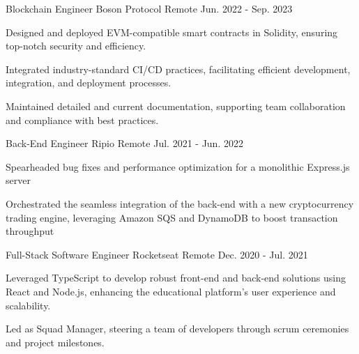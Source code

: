 

\begin{cventries}

  \cventry
    {Blockchain Engineer} %
    {Boson Protocol} %
    {Remote} %
    {Jun. 2022 - Sep. 2023} %
    {
      \begin{cvitems} %
        \item {Designed and deployed EVM-compatible smart contracts in Solidity, ensuring top-notch security and efficiency.}
        \item {Integrated industry-standard CI/CD practices, facilitating efficient development, integration, and deployment processes.}
        \item {Maintained detailed and current documentation, supporting team collaboration and compliance with best practices.}
      \end{cvitems}
    }

  \cventry
    {Back-End Engineer} %
    {Ripio} %
    {Remote} %
    {Jul. 2021 - Jun. 2022} %
    {
      \begin{cvitems}
        \item {Spearheaded bug fixes and performance optimization for a monolithic Express.js server}
        \item {Orchestrated the seamless integration of the back-end with a new cryptocurrency trading engine, leveraging Amazon SQS and DynamoDB to boost transaction throughput}
      \end{cvitems}
    }

  \cventry
    {Full-Stack Software Engineer} %
    {Rocketseat} %
    {Remote} %
    {Dec. 2020 - Jul. 2021} %
    {
      \begin{cvitems} %
        \item {Leveraged TypeScript to develop robust front-end and back-end solutions using React and Node.js, enhancing the educational platform's user experience and scalability.}
        \item {Led as Squad Manager, steering a team of developers through scrum ceremonies and project milestones.}
      \end{cvitems}
    }


\end{cventries}
